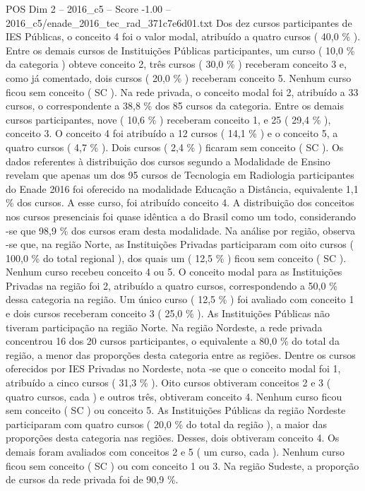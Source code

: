 \begin{textsample}{POS Dim 2 – 2016\_c5 – Score -1.00 – 2016\_c5/enade\_2016\_tec\_rad\_371c7e6d01.txt}
Dos dez cursos participantes de IES Públicas, o conceito 4 foi o valor modal, atribuído a quatro cursos ( 40,0 \% ).
Entre os demais cursos de Instituições Públicas participantes, um curso ( 10,0 \% da categoria ) obteve conceito 2, três cursos ( 30,0 \% ) receberam conceito 3 e, como já comentado, dois cursos ( 20,0 \% ) receberam conceito 5.
Nenhum curso ficou sem conceito ( SC ).
Na rede privada, o conceito modal foi 2, atribuído a 33 cursos, o correspondente a 38,8 \% dos 85 cursos da categoria.
Entre os demais cursos participantes, nove ( 10,6 \% ) receberam conceito 1, e 25 ( 29,4 \% ), conceito 3.
O conceito 4 foi atribuído a 12 cursos ( 14,1 \% ) e o conceito 5, a quatro cursos ( 4,7 \% ).
Dois cursos ( 2,4 \% ) ficaram sem conceito ( SC ).
Os dados referentes à distribuição dos cursos segundo a Modalidade de Ensino revelam que apenas um dos 95 cursos de Tecnologia em Radiologia participantes do Enade 2016 foi oferecido na modalidade Educação a Distância, equivalente 1,1 \% dos cursos.
A esse curso, foi atribuído conceito 4.
A distribuição dos conceitos nos cursos presenciais foi quase idêntica a do Brasil como um todo, considerando -se que 98,9 \% dos cursos eram desta modalidade.
Na análise por região, observa -se que, na região Norte, as Instituições Privadas participaram com oito cursos ( 100,0 \% do total regional ), dos quais um ( 12,5 \% ) ficou sem conceito ( SC ).
Nenhum curso recebeu conceito 4 ou 5.
O conceito modal para as Instituições Privadas na região foi 2, atribuído a quatro cursos, correspondendo a 50,0 \% dessa categoria na região.
Um único curso ( 12,5 \% ) foi avaliado com conceito 1 e dois cursos receberam conceito 3 ( 25,0 \% ).
As Instituições Públicas não tiveram participação na região Norte.
Na região Nordeste, a rede privada concentrou 16 dos 20 cursos participantes, o equivalente a 80,0 \% do total da região, a menor das proporções desta categoria entre as regiões.
Dentre os cursos oferecidos por IES Privadas no Nordeste, nota -se que o conceito modal foi 1, atribuído a cinco cursos ( 31,3 \% ).
Oito cursos obtiveram conceitos 2 e 3 ( quatro cursos, cada ) e outros três, obtiveram conceito 4.
Nenhum curso ficou sem conceito ( SC ) ou conceito 5.
As Instituições Públicas da região Nordeste participaram com quatro cursos ( 20,0 \% do total da região ), a maior das proporções desta categoria nas regiões.
Desses, dois obtiveram conceito 4.
Os demais foram avaliados com conceitos 2 e 5 ( um curso, cada ).
Nenhum curso ficou sem conceito ( SC ) ou com conceito 1 ou 3.
Na região Sudeste, a proporção de cursos da rede privada foi de 90,9 \%.

\end{textsample}
